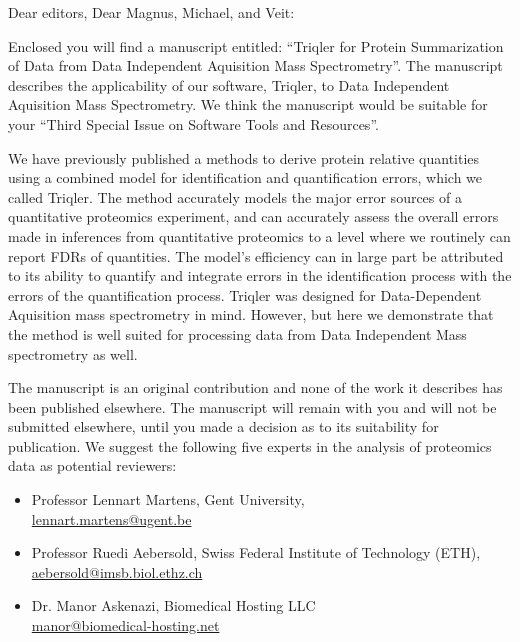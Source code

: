 \documentclass[a4paper]{letter}
\begin{document}
\begin{letter}{}
\vspace*{-5.0cm}

\opening{Dear editors, Dear Magnus, Michael, and Veit:}

Enclosed you will find a manuscript entitled: 
``Triqler for Protein Summarization of Data from Data Independent Aquisition Mass Spectrometry''. 
The manuscript describes the applicability of our software, Triqler, to Data Independent Aquisition Mass Spectrometry. We think the manuscript would be suitable for
your ``Third Special Issue on Software Tools and Resources''. 

We have previously published a methods to derive protein relative quantities 
using a combined model for identification and quantification
errors, which we called Triqler. 
The method accurately models the major error sources of a
quantitative proteomics experiment, and can accurately assess the overall errors
made in inferences from quantitative proteomics to a level where we routinely
can report FDRs of quantities. The model's efficiency can in large part be
attributed to its ability to quantify and integrate errors in the identification
process with the errors of the quantification process.
Triqler was designed for Data-Dependent Aquisition mass spectrometry in mind. 
However, but here we demonstrate that the method is well suited for processing data from Data Independent Mass spectrometry as well. 
 
The manuscript is an original contribution and none of the work it
describes has been published elsewhere. The manuscript will
remain with you and will not be submitted elsewhere, until you made a
decision as to its suitability for publication.
We suggest the following five experts in the analysis of proteomics
data as potential reviewers:

\begin{itemize}

\item Professor Lennart Martens,
Gent University, \\
\url{lennart.martens@ugent.be}

\item Professor Ruedi Aebersold, Swiss Federal Institute of Technology
      (ETH), \\
\url{aebersold@imsb.biol.ethz.ch}

\item Dr. Manor Askenazi, Biomedical Hosting LLC\\
\url{manor@biomedical-hosting.net}


\end{itemize}
\end{letter}
\end{document}
